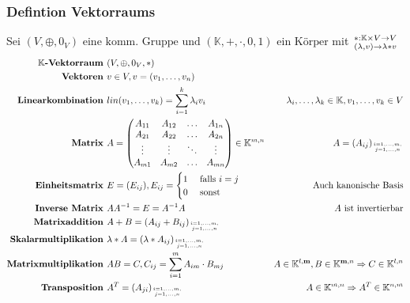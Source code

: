\documentclass{article}
\begin{document}
			\subsubsection*{Defintion Vektorraums}
				Sei $(V, \oplus, 0_V) \text{ eine komm. Gruppe und } (\mathbb{K}, +, \cdot, 0, 1) \text{ ein K\"orper}$ mit $*: \mathbb{K} \times V \rightarrow V\atop (\lambda,v) \rightarrow \lambda * v$\\
				\begin{align*}
					\textbf{$\mathbb{K}$-Vektorraum } & (V, \oplus, 0_V, *)\\
					\textbf{Vektoren } & v \in V, v = (v_1, \ldots, v_n)\\
					\textbf{Linearkombination } & lin(v_1, \ldots, v_k) = \sum_{i=1}^{k}\lambda_i v_i & \lambda_i,\ldots,\lambda_k \in \mathbb{K}, v_1, \ldots, v_k \in V\\
					\textbf{Matrix } & A = \begin{pmatrix}A_{11} & A_{12} & \ldots & A_{1n}\\A_{21} & A_{22} & \ldots & A_{2n}\\ \vdots & \vdots & \ddots & \vdots\\ A_{m1} & A_{m2} & \hdots & A_{mn}\end{pmatrix} \in \mathbb{K}^{m,n} & A = (A_{ij})_{i = 1,\ldots,m,\atop j = 1,\ldots,n}\\
					\textbf{Einheitsmatrix } & E = (E_{ij}), E_{ij} = \begin{cases}1 & \text{ falls } i = j\\0 & \text{ sonst}\end{cases} & \text{ Auch kanonische Basis}\\
					\textbf{Inverse Matrix } & AA^{-1} = E = A^{-1}A & \text{ $A$ ist invertierbar}\\
					\textbf{Matrixaddition } & A + B = (A_{ij} + B_{ij})_{i = 1,\ldots,m,\atop j = 1,\ldots,n}\\
					\textbf{Skalarmultiplikation } & \lambda * A = (\lambda * A_{ij})_{i = 1,\ldots,m,\atop j = 1,\ldots,n}\\
					\textbf{Matrixmultiplikation } & AB = C, C_{ij} = \sum_{i=1}^{m} A_{im} \cdot B_{mj} & A \in \mathbb{K}^{l,\textbf{m}}, B \in \mathbb{K}^{\textbf{m},n} \Rightarrow C \in \mathbb{K}^{l,n}\\
					\textbf{Transposition } & A^T = (A_{ji})_{i = 1,\ldots,m,\atop j = 1,\ldots,n} & A \in \mathbb{K}^{m,n} \Rightarrow A^T \in \mathbb{K}^{n,m}\\
				\end{align*}
\end{document}
